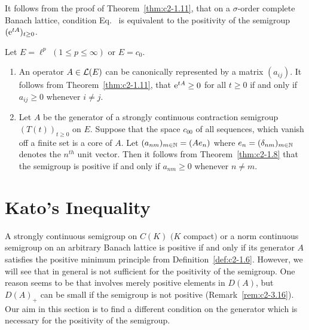 \begin{remark}\label{rem:c2-1.12}
%
It follows from the proof of Theorem~\ref{thm:c2-1.11}, that on a $\sigma$-order complete Banach lattice, condition  Eq.~ is equivalent to the positivity of the semigroup $(\eu^{tA})_{t \geq 0}$.
\end{remark}
\begin{examples}\label{ex:c2-1.13}
%
Let $E = \ell^p$ $(1 \leq p \leq \infty)$ or $E = c_{0}$.
\begin{enumerate}[\upshape (i), wide, labelindent=.25em] %
\item \label{ex:c2-1.13-1}
An operator $A \in \mathcal{L}(E)$ can be canonically represented by a matrix $(a_{ij})$. 
It follows from Theorem~\ref{thm:c2-1.11}, that $\eu^{tA} \geq 0$ for all $t \geq 0$ if and only if\/ $a_{ij} \geq 0$ whenever $i \neq j$.
\item \label{ex:c2-1.13-2}
Let $A$ be the generator of a strongly continuous contraction semigroup $(T(t))_{t \geq 0}$ on $E$.
Suppose that the space $c_{00}$ of all sequences, which vanish off a finite set is a core of\/ $A$.
Let $(a_{nm})_{m \in \mathbb{N}} = (Ae_{n})$ where $e_{n} = (\delta_{nm})_{m \in \mathbb{N}}$ denotes the $n^{th}$ unit vector.
Then it follows from Theorem~\ref{thm:c2-1.8}   that the semigroup is positive if and only if\/ $a_{nm} \geq 0$ whenever $n \neq m$.
\end{enumerate}
\end{examples}
\section{Kato's Inequality} \label{sec:c2-2}
%
A strongly continuous semigroup on $C(K)$ $(K$ compact$)$ or a norm continuous semigroup on an arbitrary Banach lattice is positive if and only if its generator $A$ satisfies the positive minimum principle  from Definition~\ref{def:c2-1.6}.
However, we will see that in general  is not sufficient for the positivity of the semigroup.
One reason seems to be that  involves merely positive elements in $D(A)$, but $D(A)_{+}$ can be small if the semigroup is not positive (\cf Remark~\ref{rem:c2-3.16}).
Our aim in this section is to find a different condition on the generator which is necessary for the positivity of the semigroup.

